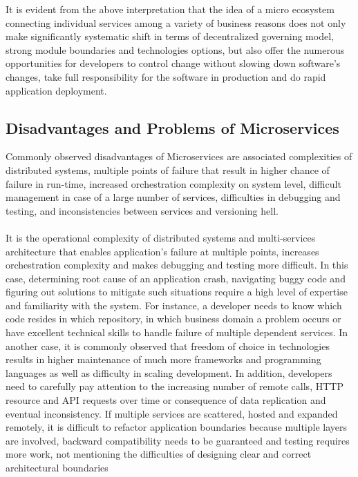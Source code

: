 \documentclass[a4paper]{book}
\begin{document}
It is evident from the above interpretation that the idea of a micro ecosystem connecting individual services among a variety of business reasons does not only make significantly systematic shift in terms of decentralized governing model, strong module boundaries and technologies options, but also offer the numerous opportunities for developers to control change without slowing down software's changes, take full responsibility for the software in production and do rapid application deployment.

\subsection{Disadvantages and Problems of Microservices} \label{Disadvantages and Problems of Microservices}

Commonly observed disadvantages of Microservices are associated complexities of distributed systems, multiple points of failure that result in higher chance of failure in run-time, increased orchestration complexity on system level, difficult management in case of a large number of services, difficulties in debugging and testing, and inconsistencies between services and versioning hell.
\\ \\
It is the operational complexity of distributed systems and multi-services architecture that enables application’s failure at multiple points, increases orchestration complexity and makes debugging and testing more difficult. In this case, determining root cause of an application crash, navigating buggy code and figuring out solutions to mitigate such situations require a high level of expertise and familiarity with the system. For instance, a developer needs to know which code resides in which repository, in which business domain a problem occurs or have excellent technical skills to handle failure of multiple dependent services. In another case, it is commonly observed that freedom of choice in technologies results in higher maintenance of much more frameworks and programming languages as well as difficulty in scaling development. In addition, developers need to carefully pay attention to the increasing number of remote calls, HTTP resource and API requests over time or consequence of data replication and eventual inconsistency. If multiple services are scattered, hosted and expanded remotely, it is difficult to refactor application boundaries because multiple layers are involved, backward compatibility needs to be guaranteed and testing requires more work, not mentioning the difficulties of designing clear and correct architectural boundaries
\\ \\
\end{document}
